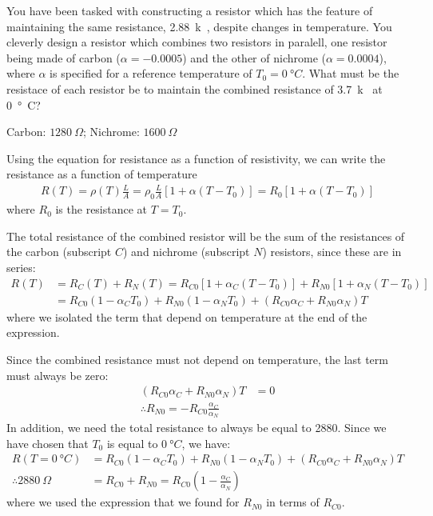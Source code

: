 \question You have been tasked with constructing a resistor which has the feature of maintaining the same resistance, \SI{2.88}{k\Omega}, despite changes in temperature. You cleverly design a resistor which combines two resistors in paralell, one resistor being made of carbon ($\alpha = -0.0005$) and the other of nichrome ($\alpha = 0.0004$), where $\alpha$ is specified for a reference temperature of $T_0 = \SI{0}{\degree C}$. What must be the resistace of each resistor be to maintain the combined resistance of \SI{3.7}{k\Omega} at \SI{0}{\degree C}?
\begin{finalanswer}
Carbon: $\SI{1280}{\Omega}$; Nichrome: $\SI{1600}{\Omega}$
\end{finalanswer}
\begin{solution}
Using the equation for resistance as a function of resistivity, we can write the resistance as a function of temperature
\begin{align*}
R(T)=\rho(T)\frac{L}{A}=\rho_0\frac{L}{A}[1+\alpha(T-T_0)]=R_0[1+\alpha(T-T_0)]
\end{align*}
where $R_0$ is the resistance at $T=T_0$.

The total resistance of the combined resistor will be the sum of the resistances of the carbon (subscript $C$) and nichrome (subscript $N$) resistors, since these are in series:
\begin{align*}
R(T)&=R_C(T)+R_N(T)=R_{C0}[1+\alpha_C(T-T_0)]+R_{N0}[1+\alpha_N(T-T_0)]\\
&=R_{C0}(1-\alpha_CT_0)+R_{N0}(1-\alpha_NT_0)+(R_{C0}\alpha_C+R_{N0}\alpha_N)T
\end{align*}
where we isolated the term that depend on temperature at the end of the expression.

Since the combined resistance must not depend on temperature, the last term must always be zero:
\begin{align*}
(R_{C0}\alpha_C+R_{N0}\alpha_N)T&=0\\
\therefore R_{N0}=-R_{C0}\frac{\alpha_C}{\alpha_N}
\end{align*}  
In addition, we need the total resistance to always be equal to \SI{2880}{\Omega}. Since we have chosen that $T_0$ is equal to $\SI{0}{\degree C}$, we have:
\begin{align*}
R(T=\SI{0}{\degree C})&=R_{C0}(1-\alpha_CT_0)+R_{N0}(1-\alpha_NT_0)+(R_{C0}\alpha_C+R_{N0}\alpha_N)T\\
\therefore\SI{2880}{\Omega}&= R_{C0}+R_{N0}=R_{C0}\left(1-\frac{\alpha_C}{\alpha_N}\right) 
\end{align*} where we used the expression that we found for $R_{N0}$ in terms of $R_{C0}$.


\end{solution}
